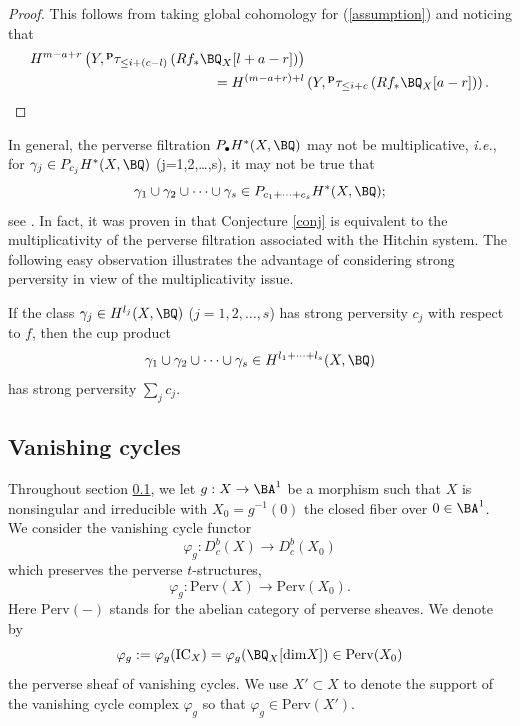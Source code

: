 \begin{proof}
This follows from taking global cohomology for (\ref{assumption}) and noticing that
\begin{align*}
    H^{m-a+r}\left(Y, {^\mathbf{p}\tau_{\leq i+(c-l)}} \left(Rf_* \BQ_X  [l+a-r] \right)\right) & \\ = H^{(m-a+r)+l}&\left(Y, {^\mathbf{p}\tau_{\leq i+c}} \left(Rf_* \BQ_X  [a-r] \right)\right). \qedhere
    \end{align*}
\end{proof}

In general, the perverse filtration $P_\bullet H^*(X, \BQ)$ may not be multiplicative, \emph{i.e.}, for $\gamma_j \in P_{c_j}H^*(X, \BQ)$ (j=1,2,\dots,s), it may not be true that
\[
\gamma_1 \cup \gamma_2 \cup \cdots \cup \gamma_s \in P_{c_1+\cdots+c_s}H^*(X, \BQ);
\]
see \cite[Exercise 5.6.8]{Park}. In fact, it was proven in \cite[Theorem 0.6]{dCMS} that Conjecture \ref{conj} is equivalent to the multiplicativity of the perverse filtration associated with the Hitchin system. The following easy observation illustrates the advantage of considering strong perversity in view of the multiplicativity issue.

\begin{lem}
\notready\label{lem1.2}
If the class $\gamma_j \in H^{l_j}(X, \BQ)$ ($j=1,2,\dots, s$) has strong perversity $c_j$ with respect to $f$, then the cup product
\[
\gamma_1 \cup \gamma_2 \cup \cdots \cup \gamma_s \in H^{l_1+\cdots+l_s}(X, \BQ)
\]
has strong perversity $\sum_jc_j$.
\end{lem}


\subsection{Vanishing cycles}\label{Sec1.2}

Throughout section \ref{Sec1.2}, we let $g: X \to \BA^1$ be a morphism such that $X$ is nonsingular and irreducible with $X_0 = g^{-1}(0)$ the closed fiber over $0 \in \BA^1$. We consider the vanishing cycle functor
\[
\varphi_g: D^b_c(X) \rightarrow D^b_c(X_0)
\]
which preserves the perverse $t$-structures,
\[
\varphi_g: \mathrm{Perv}(X) \rightarrow \mathrm{Perv}(X_0).
\]
Here $\mathrm{Perv}(-)$ stands for the abelian category of perverse sheaves. We denote by
\[
\varphi_g : = \varphi_g(\mathrm{IC}_X) = \varphi_g(\BQ_X[\mathrm{dim}X]) \in \mathrm{Perv}(X_0) \]
the perverse sheaf of vanishing cycles. We use $X' \subset X$ to denote the support of the vanishing cycle complex $\varphi_g$ so that $\varphi_g \in \mathrm{Perv}(X')$.


